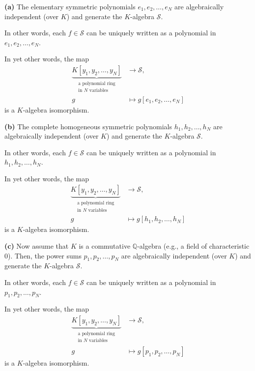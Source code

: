 \begin{theorem}
%
\label{thm.sf.ftsf}\textbf{(a)} The elementary symmetric polynomials
$e_{1},e_{2},\ldots,e_{N}$ are algebraically independent (over $K$) and
generate the $K$-algebra $\mathcal{S}$.

In other words, each $f\in\mathcal{S}$ can be uniquely written as a polynomial
in $e_{1},e_{2},\ldots,e_{N}$.

In yet other words, the map%
\begin{align*}
\underbrace{K\left[  y_{1},y_{2},\ldots,y_{N}\right]  }_{\substack{\text{a
polynomial ring}\\\text{in }N\text{ variables}}}  &  \rightarrow\mathcal{S},\\
g  &  \mapsto g\left[  e_{1},e_{2},\ldots,e_{N}\right]
\end{align*}
is a $K$-algebra isomorphism. \medskip

\textbf{(b)} The complete homogeneous symmetric polynomials $h_{1}%
,h_{2},\ldots,h_{N}$ are algebraically independent (over $K$) and generate the
$K$-algebra $\mathcal{S}$.

In other words, each $f\in\mathcal{S}$ can be uniquely written as a polynomial
in $h_{1},h_{2},\ldots,h_{N}$.

In yet other words, the map%
\begin{align*}
\underbrace{K\left[  y_{1},y_{2},\ldots,y_{N}\right]  }_{\substack{\text{a
polynomial ring}\\\text{in }N\text{ variables}}}  &  \rightarrow\mathcal{S},\\
g  &  \mapsto g\left[  h_{1},h_{2},\ldots,h_{N}\right]
\end{align*}
is a $K$-algebra isomorphism. \medskip

\textbf{(c)} Now assume that $K$ is a commutative $\mathbb{Q}$-algebra (e.g.,
a field of characteristic $0$). Then, the power sums $p_{1},p_{2},\ldots
,p_{N}$ are algebraically independent (over $K$) and generate the $K$-algebra
$\mathcal{S}$.

In other words, each $f\in\mathcal{S}$ can be uniquely written as a polynomial
in $p_{1},p_{2},\ldots,p_{N}$.

In yet other words, the map%
\begin{align*}
\underbrace{K\left[  y_{1},y_{2},\ldots,y_{N}\right]  }_{\substack{\text{a
polynomial ring}\\\text{in }N\text{ variables}}}  &  \rightarrow\mathcal{S},\\
g  &  \mapsto g\left[  p_{1},p_{2},\ldots,p_{N}\right]
\end{align*}
is a $K$-algebra isomorphism.
\end{theorem}

